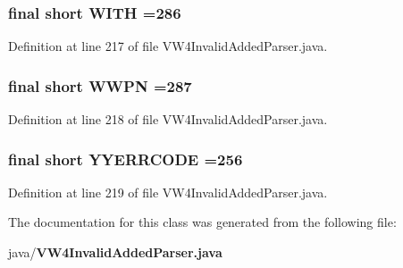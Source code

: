 \subsubsection[{W\+I\+T\+H}]{\setlength{\rightskip}{0pt plus 5cm}final short W\+I\+T\+H =286\hspace{0.3cm}{\ttfamily [static]}}\label{classorg_1_1smallfoot_1_1parser_1_1zone_1_1VW4InvalidAddedParser_a642913b35322b319f3f2dd25ab20e9ba}


Definition at line 217 of file V\+W4\+Invalid\+Added\+Parser.\+java.

\subsubsection[{W\+W\+P\+N}]{\setlength{\rightskip}{0pt plus 5cm}final short W\+W\+P\+N =287\hspace{0.3cm}{\ttfamily [static]}}\label{classorg_1_1smallfoot_1_1parser_1_1zone_1_1VW4InvalidAddedParser_ab9a3de9a217cad4ad00a26e6324f275e}


Definition at line 218 of file V\+W4\+Invalid\+Added\+Parser.\+java.

\subsubsection[{Y\+Y\+E\+R\+R\+C\+O\+D\+E}]{\setlength{\rightskip}{0pt plus 5cm}final short Y\+Y\+E\+R\+R\+C\+O\+D\+E =256\hspace{0.3cm}{\ttfamily [static]}}\label{classorg_1_1smallfoot_1_1parser_1_1zone_1_1VW4InvalidAddedParser_a1c58472ea6621d2f613831e08d10dba3}


Definition at line 219 of file V\+W4\+Invalid\+Added\+Parser.\+java.



The documentation for this class was generated from the following file\+:\begin{DoxyCompactItemize}
\item 
java/{\bf V\+W4\+Invalid\+Added\+Parser.\+java}\end{DoxyCompactItemize}
